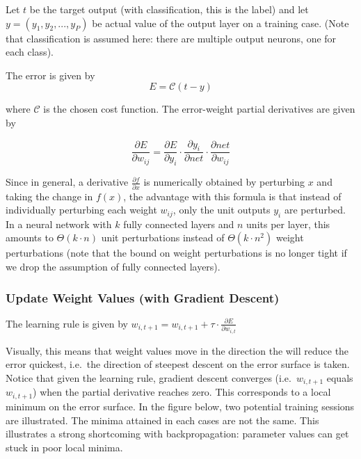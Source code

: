 \documentclass[a4paper,11pt]{article}
\begin{document}
Let $t$ be the target output (with classification, this is the label) and let $y = (y_{1}, y_{2}, ..., y_{P})$ be actual value of the output layer on a training case. (Note that classification is assumed here: there are multiple output neurons, one for each class).

The error is given by 
\begin{equation}
E = \mathcal{C}(t-y)
\end{equation}

where $\mathcal{C}$ is the chosen cost function. The error-weight partial derivatives are given by

\begin{equation}
\frac{\partial{E}}{\partial{w_{ij}}} = \frac{\partial{E}}{\partial{y_{i}}} \cdot \frac{\partial{y_{i}}}{\partial{net}} \cdot \frac{\partial{net}}{\partial{w_{ij}}}
\end{equation}

Since in general, a derivative $\frac{\partial{f}}{\partial{x}}$ is numerically obtained by perturbing $x$ and taking the change in $f(x)$, the advantage with this formula is that instead of individually perturbing each weight $w_{ij}$, only the unit outputs $y_{i}$ are perturbed. In a neural network with $k$ fully connected layers and $n$ units per layer, this amounts to $\Theta(k \cdot n)$ unit perturbations instead of $\Theta(k \cdot n^{2})$ weight perturbations (note that the bound on weight perturbations is no longer tight if we drop the assumption of fully connected layers).

\subsubsection{Update Weight Values (with Gradient Descent)}

The learning rule is given by $w_{i,t+1} = w_{i,t+1} + \tau \cdot \frac{\partial{E}}{\partial{w_{i,t}}}$

Visually, this means that weight values move in the direction the will reduce the error quickest, i.e.\ the direction of steepest descent on the error surface is taken. Notice that given the learning rule, gradient descent converges (i.e.\ $w_{i,t+1}$ equals $w_{i,t+1}$) when the partial derivative reaches zero. This corresponds to a local minimum on the error surface. In the figure below, two potential training sessions are illustrated. The minima attained in each cases are not the same. This illustrates a strong shortcoming with backpropagation: parameter values can get stuck in poor local minima.
\end{document}
